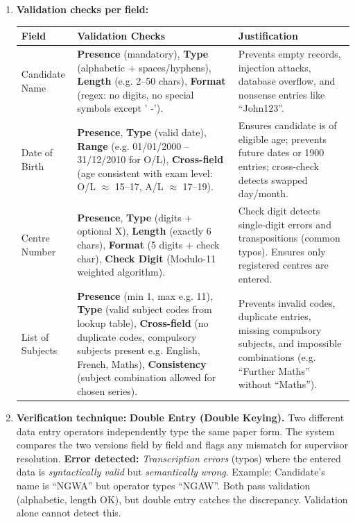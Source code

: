 \documentclass[11pt]{article}
\begin{document}
\begin{corrige}
\begin{enumerate}
\item \textbf{Validation checks per field:}
\begin{center}
\begin{tabularx}{\linewidth}{|l|X|X|}
\hline
\rowcolor{popblueL} \textbf{Field} & \textbf{Validation Checks} & \textbf{Justification} \\
\hline
Candidate Name & \textbf{Presence} (mandatory), \textbf{Type} (alphabetic + spaces/hyphens), \textbf{Length} (e.g. 2–50 chars), \textbf{Format} (regex: no digits, no special symbols except ' -'). & Prevents empty records, injection attacks, database overflow, and nonsense entries like ``John123''. \\
\hline
Date of Birth & \textbf{Presence}, \textbf{Type} (valid date), \textbf{Range} (e.g. 01/01/2000 – 31/12/2010 for O/L), \textbf{Cross-field} (age consistent with exam level: O/L $\approx$ 15–17, A/L $\approx$ 17–19). & Ensures candidate is of eligible age; prevents future dates or 1900 entries; cross-check detects swapped day/month. \\
\hline
Centre Number & \textbf{Presence}, \textbf{Type} (digits + optional X), \textbf{Length} (exactly 6 chars), \textbf{Format} (5 digits + check char), \textbf{Check Digit} (Modulo-11 weighted algorithm). & Check digit detects single-digit errors and transpositions (common typos). Ensures only registered centres are entered. \\
\hline
List of Subjects & \textbf{Presence} (min 1, max e.g. 11), \textbf{Type} (valid subject codes from lookup table), \textbf{Cross-field} (no duplicate codes, compulsory subjects present e.g. English, French, Maths), \textbf{Consistency} (subject combination allowed for chosen series). & Prevents invalid codes, duplicate entries, missing compulsory subjects, and impossible combinations (e.g. ``Further Maths'' without ``Maths''). \\
\hline
\end{tabularx}
\end{center}
\item \textbf{Verification technique:} \textbf{Double Entry (Double Keying).} Two different data entry operators independently type the same paper form. The system compares the two versions field by field and flags any mismatch for supervisor resolution.
\textbf{Error detected:} \emph{Transcription errors} (typos) where the entered data is \emph{syntactically valid} but \emph{semantically wrong}. Example: Candidate's name is ``NGWA'' but operator types ``NGAW''. Both pass validation (alphabetic, length OK), but double entry catches the discrepancy. Validation alone cannot detect this.

\end{enumerate}
\end{corrige}
\end{document}
